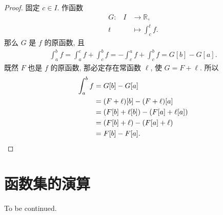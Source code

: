 \begin{proof}
    固定 $c \in I$. 作函数
    \begin{align*}
        \text{$G$:} \quad
        I & \to \mathbb{R},           \\
        t & \mapsto \int_{c}^{t} {f}.
    \end{align*}
    那么 $G$ 是 $f$ 的原函数, 且
    \begin{align*}
        \int_{a}^{b} {f}
        = \int_{a}^{c} {f} + \int_{c}^{b} {f}
        = -\int_{c}^{a} {f} + \int_{c}^{b} {f}
        = G[b] - G[a].
    \end{align*}
    既然 $F$ 也是 $f$ 的原函数, 那必定存在常函数 $\ell$, 使 $G = F + \ell$. 所以
    \begin{align*}
        \int_{a}^{b} {f}
        = {} & G[b] - G[a]                         \\
        = {} & (F + \ell)[b] - (F + \ell)[a]       \\
        = {} & (F[b] + \ell[b]) - (F[a] + \ell[a]) \\
        = {} & (F[b] + \ell) - (F[a] + \ell)       \\
        = {} & F[b] - F[a]. \qedhere
    \end{align*}
\end{proof}

\section{函数集的演算}

To be continued.
